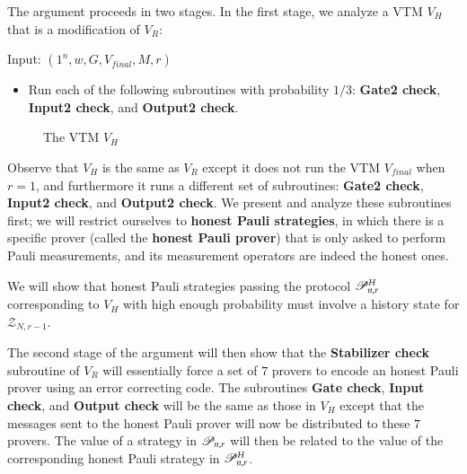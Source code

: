 The argument proceeds in two stages. In the first stage, we analyze a VTM $V_H$ that is a modification of $V_R$: 

\begin{center}
\begin{mdframed}
    Input: $(1^n,w,G,V_{final},M,r)$
    \begin{itemize}
    	\item Run each of the following subroutines with probability $1/3$: \textbf{Gate2 check}, \textbf{Input2 check}, and \textbf{Output2 check}.
		\end{itemize}
\end{mdframed}

\begin{figure}[H]
\caption{The VTM $V_H$}
\label{fig:vtm_h}
\end{figure}
\end{center}

Observe that $V_H$ is the same as $V_R$ except it does not run the VTM $V_{final}$ when $r = 1$, and furthermore it runs a different set of subroutines: \textbf{Gate2 check}, \textbf{Input2 check}, and \textbf{Output2 check}. We present and analyze these subroutines first; we will restrict ourselves to \textbf{honest Pauli strategies}, in which there is a specific prover (called the \textbf{honest Pauli prover}) that is only asked to perform Pauli measurements, and its measurement operators are indeed the honest ones.

We will show that honest Pauli strategies passing the protocol $\mathscr{P}^H_{n,r}$ corresponding to $V_H$ with high enough probability must involve a history state for $\mathscr{Z}_{N,r-1}$.

The second stage of the argument will then show that the \textbf{Stabilizer check} subroutine of $V_R$ will essentially force a set of $7$ provers to encode an honest Pauli prover using an error correcting code. The subroutines \textbf{Gate check}, \textbf{Input check}, and \textbf{Output check} will be the same as those in $V_H$ except that the messages sent to the honest Pauli prover will now be distributed to these $7$ provers. The value of a strategy in $\mathscr{P}_{n,r}$ will then be related to the value of the corresponding honest Pauli strategy in $\mathscr{P}^H_{n,r}$.


